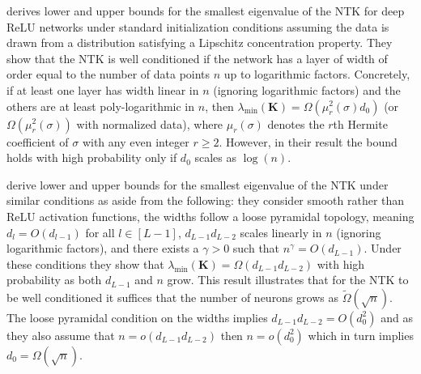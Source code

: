 \documentclass{article}
\theoremstyle{definition}
\def\mK{{\bm{K}}}
\begin{document}
\citet[Theorem 4.1]{nguyen2021tight} derives lower and upper bounds for the smallest eigenvalue of the NTK for deep ReLU networks under standard initialization conditions assuming the data is drawn from a distribution satisfying a Lipschitz concentration property. 
They show that the NTK is well conditioned if the network has a layer of width of order equal to the number of data points $n$ up to logarithmic factors. Concretely, if at least one layer has width linear in $n$ (ignoring logarithmic factors) and the others are at least poly-logarithmic in $n$, then  $\lambda_{\min}(\mK) = \Omega(\mu_r^2(\sigma)d_0)$ (or $\Omega(\mu_r^2(\sigma) )$ with normalized data), where $\mu_r(\sigma)$ denotes the $r$th Hermite coefficient of $\sigma$ with any even integer $r \geq 2$. 
However, in their result the bound holds with high probability only if $d_0$ scales as $\log(n)$. 


\citet[Theorem 1]{bombari2022memorization} derive lower and upper bounds for the smallest eigenvalue of the NTK under similar conditions as \citet[Theorem 4.1]{nguyen2021tight} aside from the following: 
they consider smooth rather than ReLU activation functions, the widths follow a loose pyramidal topology, meaning $d_l = O(d_{l-1})$ for all $l \in [L-1]$, $d_{L-1}d_{L-2}$ scales linearly in $n$ (ignoring logarithmic factors), and there exists a $\gamma >0$ such that $n^{\gamma} = O(d_{L-1})$. 
Under these conditions they show that $\lambda_{\min}(\mK) = \Omega(d_{L-1} d_{L-2})$ with high probability as both $d_{L-1}$ and $n$ grow. This result illustrates that for the NTK to be well conditioned it suffices that the number of neurons grows as $\tilde{\Omega}(\sqrt{n})$. The loose pyramidal condition on the widths implies $d_{L-1} d_{L-2} = O(d_0^2)$ and as 
they also assume that $n = o(d_{L-1}d_{L-2})$ then $n = o(d_0^2)$ which in turn implies $d_0 = \Omega(\sqrt{n})$. 
\end{document}
